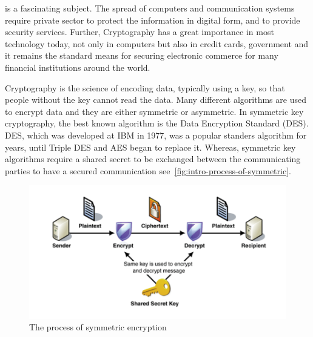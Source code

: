 \documentclass[12pt,journal,compsoc]{IEEEtran}
\begin{document}
%
%
%
%
  is a fascinating subject. The spread of
computers and communication systems require private sector to protect
the information in digital form, and to provide security
services. Further, Cryptography has a great importance in most
technology today, not only in computers but also in credit cards,
government and it remains the standard means for securing electronic
commerce for many financial institutions around the world. 
\par
Cryptography is the science of encoding data, typically using a key,
so that people without the key cannot read the data. Many different
algorithms are used to encrypt data and they are either symmetric or
asymmetric. In symmetric key cryptography, the best known algorithm is
the Data Encryption Standard (DES). DES, which was developed at IBM in
1977, was a popular standers algorithm for years, until Triple DES and
AES began to replace it. Whereas, symmetric key algorithms require a
shared secret to be exchanged between the communicating parties to
have a secured communication
see~\autoref{fig:intro-process-of-symmetric}. 
\begin{figure}[!t]
  \centering
  \includegraphics[scale=0.5]{Figure/Symmetric}
  \caption{The process of symmetric encryption}
  \label{fig:intro-process-of-symmetric}
\end{figure}
\end{document}
